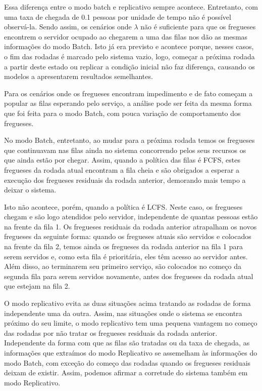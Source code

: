 \documentclass[a4paper,10pt]{article}
\begin{document}
    Essa diferença entre o modo batch e replicativo sempre acontece. Entretanto, com uma taxa de chegada de 0.1 pessoas por unidade de tempo não é possível observá-la. Sendo assim, os cenários onde $\lambda$ não é suficiente para que os fregueses encontrem o servidor ocupado ao chegarem a uma das filas nos dão as mesmas informações do modo Batch. Isto já era previsto e acontece porque, nesses casos, o fim das rodadas é marcado pelo sistema vazio, logo, começar a próxima rodada a partir deste estado ou replicar a condição inicial não faz diferença, causando os modelos a apresentarem resultados semelhantes.

    Para os cenários onde os fregueses encontram impedimento e de fato começam a popular as filas esperando pelo serviço, a análise pode ser feita da mesma forma que foi feita para o modo Batch, com pouca variação de comportamento dos fregueses.

    No modo Batch, entretanto, ao mudar para a próxima rodada temos os fregueses que continuavam nas filas ainda no sistema concorrendo pelos seus recursos os que ainda estão por chegar. Assim, quando a política das filas é FCFS, estes fregueses da rodada atual encontram a fila cheia e são obrigados a esperar a execução dos fregueses residuais da rodada anterior, demorando mais tempo a deixar o sistema.

    Isto não acontece, porém, quando a política é LCFS. Neste caso, os fregueses chegam e são logo atendidos pelo servidor, independente de quantas pessoas estão na frente da fila 1. Os fregueses residuais da rodada anterior atrapalham os novos fregueses da seguinte forma: quando os fregueses atuais são servidos e colocados na frente da fila 2, temos ainda os fregueses da rodada anterior na fila 1 para serem servidos e, como esta fila é prioritária,  eles têm acesso ao servidor antes. Além disso, ao terminarem seu primeiro serviço, são colocados no começo da segunda fila para serem servidos novamente, antes dos fregueses da rodada atual que estejam na fila 2.

    O modo replicativo evita as duas situações acima tratando as rodadas de forma independente uma da outra. Assim, nas situações onde o sistema se encontra próximo do seu limite, o modo replicativo tem uma pequena vantagem no começo das rodadas por não tratar os fregueses residuais da rodada anterior. Independente da forma com que as filas são tratadas ou da taxa de chegada, as informações que extraímos do modo Replicativo se assemelham às informações do modo Batch, com exceção do começo das rodadas quando os fregueses residuais deixam de existir. Assim, podemos afirmar a corretude do sistema também em modo Replicativo.
\end{document}

